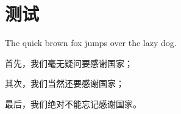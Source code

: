 \documentclass[
    bachelor, 
    ]{xjtuthesis}
\begin{document}

            \section{测试}

                The quick brown fox jumps over the lazy dog.

    \xjtuendappendix


        首先，我们毫无疑问要感谢国家；

        其次，我们当然还要感谢国家；

        最后，我们绝对不能忘记感谢国家。
\end{document}
